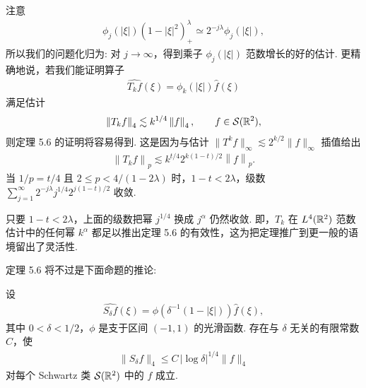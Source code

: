注意
\begin{align*}
  \phi_{j}(|\xi|)(1-|\xi|^{2})_{+}^{\lambda}\simeq 2^{-j\lambda}\phi_{j}(|\xi|),
\end{align*}
所以我们的问题化归为: 对 $j \to \infty$，得到乘子 $\phi_j(|\xi|)$ 范数增长的好的估计. 更精确地说，若我们能证明算子
\begin{align*}
  \widehat{T_{k}f}(\xi)=\phi_{k}(|\xi|)\widehat{f}(\xi)
\end{align*}
满足估计
\begin{align*}
  \left\|T_{k}f\right\|_{4}\lesssim k^{1/4}\left\|f\right\|_{4},\qquad f\in\mathcal{S}(\mathbb{R}^{2}),
\end{align*}
则定理 5.6 的证明将容易得到. 这是因为与估计 $\|T^k f\|_\infty \lesssim 2^{k/2}\|f\|_\infty$ 插值给出
\begin{align*}
  \left\|T_{k}f\right\|_{p}\lesssim k^{t/4}2^{k(1-t)/2}\left\|f\right\|_{p}.
\end{align*}
当 $1/p = t/4$ 且 $2 \leq p < 4/(1 - 2\lambda)$ 时，$1 - t < 2\lambda$，级数 $\sum_{j=1}^{\infty}2^{-j\lambda}j^{1/4}2^{j(1-t)/2}$ 收敛.

\begin{remark}\label{rem:5.7}
只要 $1 - t < 2\lambda$，上面的级数把幂 $j^{1/4}$ 换成 $j^\alpha$ 仍然收敛. 即，$T_k$ 在 $L^4(\mathbb{R}^2)$ 范数估计中的任何幂 $k^\alpha$ 都足以推出定理 5.6 的有效性，这为把定理推广到更一般的语境留出了灵活性.
\end{remark}

定理 5.6 将不过是下面命题的推论:

\begin{proposition}\label{prop:5.8}
设
\begin{align*}
  \widehat{S_{\delta}f}(\xi)=\phi(\delta^{-1}(1-|\xi|))\widehat{f}(\xi),
\end{align*}
其中 $0 < \delta < 1/2$，$\phi$ 是支于区间 $(-1,1)$ 的光滑函数. 存在与 $\delta$ 无关的有限常数 $C$，使
\begin{align*}
  \|S_{\delta}f\|_{4}\leq C\,|\log\delta|^{1/4}\|f\|_{4}
\end{align*}
对每个 Schwartz 类 $\mathcal{S}(\mathbb{R}^{2})$ 中的 $f$ 成立.
\end{proposition}

